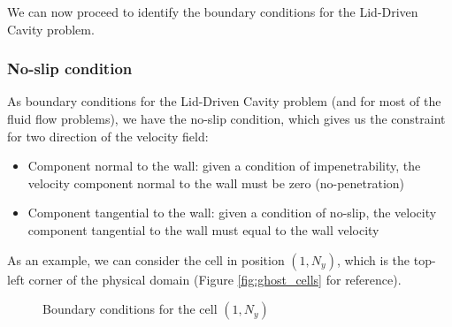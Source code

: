 We can now proceed to identify the boundary conditions for the Lid-Driven Cavity problem.



\subsubsection{No-slip condition}

As boundary conditions for the Lid-Driven Cavity problem (and for most of the fluid flow problems), we have the no-slip condition, which gives us the constraint for two direction of the velocity field:

\begin{itemize}
    \item Component normal to the wall: given a condition of impenetrability, the velocity component normal to the wall must be zero (no-penetration)
    \item Component tangential to the wall: given a condition of no-slip, the velocity component tangential to the wall must equal to the wall velocity
\end{itemize}

As an example, we can consider the cell in position $(1, N_y)$, which is the top-left corner of the physical domain (Figure \ref{fig:ghost_cells} for reference).

\begin{figure}[H]
    \centering
    \def\nCV{2}
    \def\dX{3cm}
    \def\dY{3cm}

    \caption{Boundary conditions for the cell $(1, N_y)$}
    \label{fig:boundary_conditions_1Ny}
\end{figure}

